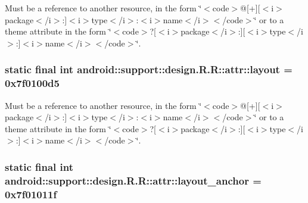 Must be a reference to another resource, in the form \char`\"{}$<$code$>$@\mbox{[}+\mbox{]}\mbox{[}$<$i$>$package$<$/i$>$:\mbox{]}$<$i$>$type$<$/i$>$:$<$i$>$name$<$/i$>$$<$/code$>$\char`\"{} or to a theme attribute in the form \char`\"{}$<$code$>$?\mbox{[}$<$i$>$package$<$/i$>$:\mbox{]}\mbox{[}$<$i$>$type$<$/i$>$:\mbox{]}$<$i$>$name$<$/i$>$$<$/code$>$\char`\"{}. \hypertarget{classandroid_1_1support_1_1design_1_1_r_1_1attr_844f4cbe8e3ef7d59c3dbeebe38126cc}{
\subsubsection[{layout}]{\setlength{\rightskip}{0pt plus 5cm}static final int android::support::design.R.R::attr::layout = 0x7f0100d5}}
\label{classandroid_1_1support_1_1design_1_1_r_1_1attr_844f4cbe8e3ef7d59c3dbeebe38126cc}


Must be a reference to another resource, in the form \char`\"{}$<$code$>$@\mbox{[}+\mbox{]}\mbox{[}$<$i$>$package$<$/i$>$:\mbox{]}$<$i$>$type$<$/i$>$:$<$i$>$name$<$/i$>$$<$/code$>$\char`\"{} or to a theme attribute in the form \char`\"{}$<$code$>$?\mbox{[}$<$i$>$package$<$/i$>$:\mbox{]}\mbox{[}$<$i$>$type$<$/i$>$:\mbox{]}$<$i$>$name$<$/i$>$$<$/code$>$\char`\"{}. \hypertarget{classandroid_1_1support_1_1design_1_1_r_1_1attr_4411b92fa36b247f9bb1a22267042bf4}{
\subsubsection[{layout\_\-anchor}]{\setlength{\rightskip}{0pt plus 5cm}static final int android::support::design.R.R::attr::layout\_\-anchor = 0x7f01011f}}
\label{classandroid_1_1support_1_1design_1_1_r_1_1attr_4411b92fa36b247f9bb1a22267042bf4}



